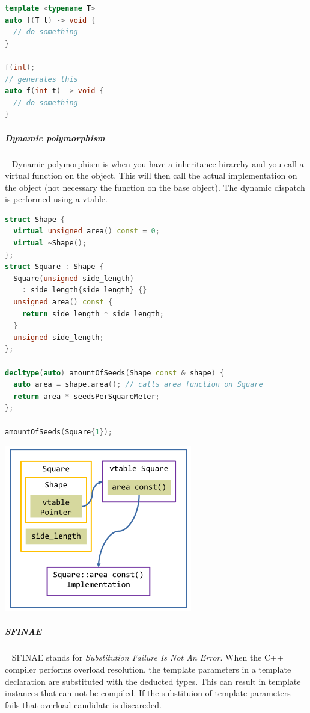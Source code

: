 \documentclass[11pt,twoside,landscape]{article}
\begin{document}
\begin{multicols}{2}
\begin{lstlisting}[language=c++,label=lst:example-for-a-cpp-template,caption={Example for a C++ template},captionpos=b,numbers=none]
template <typename T>
auto f(T t) -> void {
  // do something
}

f(int);
// generates this
auto f(int t) -> void {
  // do something
}
\end{lstlisting}

\subparagraph{Dynamic polymorphism} \
\label{sec:org3700fdf}
Dynamic polymorphism is when you have a inheritance hirarchy and you call a virtual function on the object.
This will then call the actual implementation on the object (not necessary the function on the base object).
The dynamic dispatch is performed using a \href{../../../roam/20221230181314-what_is_the_virtual_method_table.org}{vtable}.

\begin{lstlisting}[language=c++,numbers=none]
struct Shape {
  virtual unsigned area() const = 0;
  virtual ~Shape();
};
struct Square : Shape {
  Square(unsigned side_length)
    : side_length{side_length} {}
  unsigned area() const {
    return side_length * side_length;
  }
  unsigned side_length;
};

decltype(auto) amountOfSeeds(Shape const & shape) {
  auto area = shape.area(); // calls area function on Square
  return area * seedsPerSquareMeter;
};

amountOfSeeds(Square{1});
\end{lstlisting}


{
\begin{center}
\includegraphics[width=.9\linewidth]{img/dynamic_dispatch.png}
\end{center}
\label{fig:dynamic-dispatch}
}
\subparagraph{SFINAE} \
\label{sec:org2ff92ab}
SFINAE stands for \emph{Substitution Failure Is Not An Error}.
When the C++ compiler performs overload resolution, the template parameters in a template declaration are substituted with the deducted types.
This can result in template instances that can not be compiled.
If the substituion of template parameters fails that overload candidate is discareded.


\end{multicols}
\end{document}
